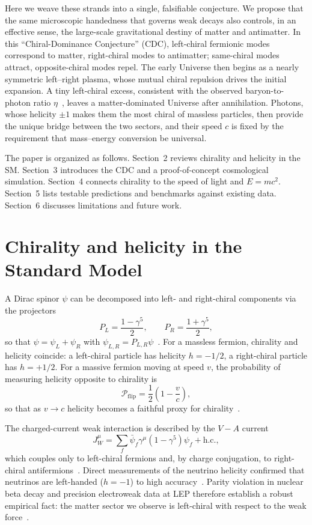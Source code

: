 \documentclass[11pt,a4paper]{article}
\begin{document}
Here we weave these strands into a single, falsifiable conjecture. We propose that the same microscopic handedness that governs weak decays also controls, in an effective sense, the large-scale gravitational destiny of matter and antimatter. In this ``Chiral-Dominance Conjecture'' (CDC), left-chiral fermionic modes correspond to matter, right-chiral modes to antimatter; same-chiral modes attract, opposite-chiral modes repel. The early Universe then begins as a nearly symmetric left--right plasma, whose mutual chiral repulsion drives the initial expansion. A tiny left-chiral excess, consistent with the observed baryon-to-photon ratio $\eta$~\cite{planck2020}, leaves a matter-dominated Universe after annihilation. Photons, whose helicity $\pm1$ makes them the most chiral of massless particles, then provide the unique bridge between the two sectors, and their speed $c$ is fixed by the requirement that mass--energy conversion be universal.

The paper is organized as follows. Section~2 reviews chirality and helicity in the SM. Section~3 introduces the CDC and a proof-of-concept cosmological simulation. Section~4 connects chirality to the speed of light and $E=mc^2$. Section~5 lists testable predictions and benchmarks against existing data. Section~6 discusses limitations and future work.

\section*{Chirality and helicity in the Standard Model}

A Dirac spinor $\psi$ can be decomposed into left- and right-chiral components via the projectors
\begin{equation}
P_L=\frac{1-\gamma^5}{2},\qquad P_R=\frac{1+\gamma^5}{2},
\end{equation}
so that $\psi=\psi_L+\psi_R$ with $\psi_{L,R}=P_{L,R}\psi$~\cite{dirac1928,peskin1995}. For a massless fermion, chirality and helicity coincide: a left-chiral particle has helicity $h=-1/2$, a right-chiral particle has $h=+1/2$. For a massive fermion moving at speed $v$, the probability of measuring helicity opposite to chirality is
\begin{equation}
\mathcal{P}_{\text{flip}}=\frac{1}{2}\left(1-\frac{v}{c}\right),
\label{eq:flip}
\end{equation}
so that as $v\to c$ helicity becomes a faithful proxy for chirality~\cite{peskin1995}.

The charged-current weak interaction is described by the $V-A$ current
\begin{equation}
J_W^\mu=\sum_f\bar\psi_f\gamma^\mu(1-\gamma^5)\psi_f+\text{h.c.},
\end{equation}
which couples only to left-chiral fermions and, by charge conjugation, to right-chiral antifermions~\cite{wu1957,lep2006}. Direct measurements of the neutrino helicity confirmed that neutrinos are left-handed ($h=-1$) to high accuracy~\cite{goldhaber1958}. Parity violation in nuclear beta decay and precision electroweak data at LEP therefore establish a robust empirical fact: the matter sector we observe is left-chiral with respect to the weak force~\cite{wu1957,lep2006}.
\end{document}
